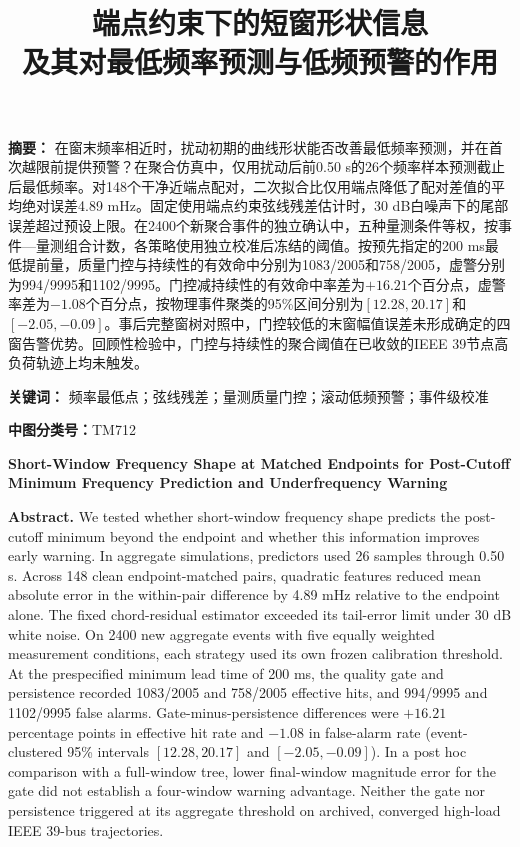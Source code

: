 \documentclass[UTF8,a4paper,11pt]{ctexart}
\title{端点约束下的短窗形状信息\\及其对最低频率预测与低频预警的作用}
\author{}
\date{}
\begin{document}
\maketitle

\noindent\textbf{摘要：} 在窗末频率相近时，扰动初期的曲线形状能否改善最低频率预测，并在首次越限前提供预警？在聚合仿真中，仅用扰动后前0.50 s的26个频率样本预测截止后最低频率。对148个干净近端点配对，二次拟合比仅用端点降低了配对差值的平均绝对误差4.89 mHz。固定使用端点约束弦线残差估计时，30 dB白噪声下的尾部误差超过预设上限。在2400个新聚合事件的独立确认中，五种量测条件等权，按事件—量测组合计数，各策略使用独立校准后冻结的阈值。按预先指定的200 ms最低提前量，质量门控与持续性的有效命中分别为1083/2005和758/2005，虚警分别为994/9995和1102/9995。门控减持续性的有效命中率差为$+16.21$个百分点，虚警率差为$-1.08$个百分点，按物理事件聚类的95\%区间分别为$[12.28,20.17]$和$[-2.05,-0.09]$。事后完整窗树对照中，门控较低的末窗幅值误差未形成确定的四窗告警优势。回顾性检验中，门控与持续性的聚合阈值在已收敛的IEEE 39节点高负荷轨迹上均未触发。

\noindent\textbf{关键词：} 频率最低点；弦线残差；量测质量门控；滚动低频预警；事件级校准

\noindent\textbf{中图分类号：}TM712

\begin{center}
\textbf{Short-Window Frequency Shape at Matched Endpoints for Post-Cutoff Minimum Frequency Prediction and Underfrequency Warning}
\end{center}

\noindent\textbf{Abstract.} We tested whether short-window frequency shape predicts the post-cutoff minimum beyond the endpoint and whether this information improves early warning. In aggregate simulations, predictors used 26 samples through 0.50 s. Across 148 clean endpoint-matched pairs, quadratic features reduced mean absolute error in the within-pair difference by 4.89 mHz relative to the endpoint alone. The fixed chord-residual estimator exceeded its tail-error limit under 30 dB white noise. On 2400 new aggregate events with five equally weighted measurement conditions, each strategy used its own frozen calibration threshold. At the prespecified minimum lead time of 200 ms, the quality gate and persistence recorded 1083/2005 and 758/2005 effective hits, and 994/9995 and 1102/9995 false alarms. Gate-minus-persistence differences were $+16.21$ percentage points in effective hit rate and $-1.08$ in false-alarm rate (event-clustered 95\% intervals $[12.28,20.17]$ and $[-2.05,-0.09]$). In a post hoc comparison with a full-window tree, lower final-window magnitude error for the gate did not establish a four-window warning advantage. Neither the gate nor persistence triggered at its aggregate threshold on archived, converged high-load IEEE 39-bus trajectories.
\end{document}
